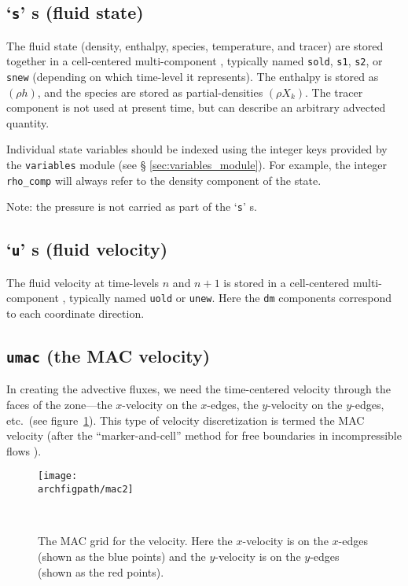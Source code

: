 \subsection{`{\tt s}' \multifab s (fluid state)}

The fluid state (density, enthalpy, species, temperature, and tracer)
are stored together in a cell-centered multi-component \multifab,
typically named {\tt sold}, {\tt s1}, {\tt s2}, or {\tt snew}
(depending on which time-level it represents).  The enthalpy is stored
as $(\rho h)$, and the species are stored as partial-densities $(\rho
X_k)$.  The tracer component is not used at present time, but can
describe an arbitrary advected quantity.

Individual state variables should be indexed using the integer keys
provided by the {\tt variables} module (see \S
\ref{sec:variables_module}).  For example, the integer {\tt rho\_comp}
will always refer to the density component of the state.

Note: the pressure is not carried as part of the `{\tt s}' \multifab s.


\subsection{`{\tt u}' \multifab s (fluid velocity)}

The fluid velocity at time-levels $n$ and $n+1$ is stored in
a cell-centered multi-component \multifab, typically named
{\tt uold} or {\tt unew}.  Here the {\tt dm}
components correspond to each coordinate direction.

\subsection{{\tt umac} (the MAC velocity)}

In creating the advective fluxes, we need the time-centered velocity
through the faces of the zone---the $x$-velocity on the $x$-edges, the
$y$-velocity on the $y$-edges, etc.\ (see figure~\ref{fig:mac}).  This
type of velocity discretization is termed the MAC velocity (after the
``marker-and-cell'' method for free boundaries in incompressible
flows \cite{harlowwelch:1965}).



\begin{figure}[t]
\centering
\texttt{[image: \\archfigpath/mac2]}
\hspace{0.1in}
\begin{minipage}[b]{3.8in}
\caption[The MAC grid]
{\label{fig:mac} The MAC grid for the velocity.  
Here the $x$-velocity is on the $x$-edges (shown as the 
blue points) and the $y$-velocity is on the $y$-edges
(shown as the red points).
}\ \\
\end{minipage}
\end{figure}

